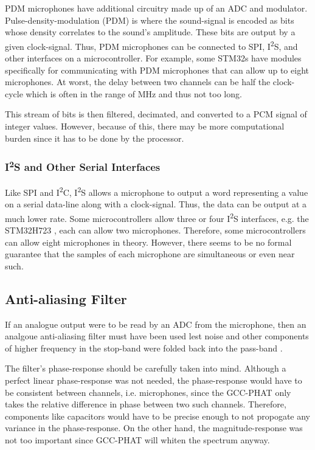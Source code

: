 \documentclass[notitlepage]{report}
\begin{document}
PDM microphones have additional circuitry made up of an ADC and modulator\cite{lewis_analog_nodate}. Pulse-density-modulation (PDM) is where the sound-signal is encoded as bits whose density correlates to the sound's amplitude. These bits are output by a given clock-signal. Thus, PDM microphones can be connected to SPI, I\textsuperscript{2}S, and other interfaces on a microcontroller. For example, some STM32s have modules specifically for communicating with PDM microphones that can allow up to eight microphones\cite{noauthor_interfacing_2019}. At worst, the delay between two channels can be half the clock-cycle which is often in the range of \si{MHz} and thus not too long\cite{lewis_analog_nodate}.

This stream of bits is then filtered, decimated, and converted to a PCM signal of integer values. However, because of this, there may be more computational burden since it has to be done by the processor.

\subsubsection{I\textsuperscript{2}S and Other Serial Interfaces}

Like SPI and I\textsuperscript{2}C, I\textsuperscript{2}S allows a microphone to output a word representing a value on a serial data-line along with a clock-signal\cite{lewis_analog_nodate}. Thus, the data can be output at a much lower rate. Some microcontrollers allow three or four I\textsuperscript{2}S interfaces, e.g. the STM32H723 \cite{noauthor_arm_2021}, each can allow two microphones. Therefore, some microcontrollers can allow eight microphones in theory. However, there seems to be no formal guarantee that the samples of each microphone are simultaneous or even near such.

\subsection{Anti-aliasing Filter}

If an analogue output were to be read by an ADC from the microphone, then an analgoue anti-aliasing filter must have been used lest noise and other components of higher frequency in the stop-band were folded back into the pass-band\cite{horowitz_1351_2015} \cite{noauthor_filter_2002}.

The filter's phase-response should be carefully taken into mind. Although a perfect linear phase-response was not needed, the phase-response would have to be consistent between channels, i.e. microphones, since the GCC-PHAT only takes the relative difference in phase between two such channels. Therefore, components like capacitors would have to be precise enough to not propogate any variance in the phase-response. On the other hand, the magnitude-response was not too important since GCC-PHAT will whiten the spectrum anyway.
\end{document}
